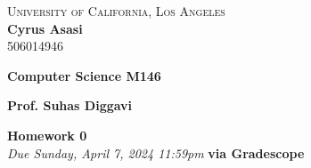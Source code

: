 \documentclass[letterpaper]{article}
\author{Hecate}
\date{\today}
\title{}
\theoremstyle{definition}
\begin{document}
\begin{center}
    \large\textsc{University of California, Los Angeles} \\
    \large\textbf{Cyrus Asasi} \\
    \large\textsc{506014946}
        
    \begin{minipage}[t]{0.5\textwidth}
        \raggedright
        \textbf{Computer Science M146}
    \end{minipage}%
    \begin{minipage}[t]{0.5\textwidth}
        \raggedleft
        \textbf{Prof. Suhas Diggavi}
    \end{minipage}
    \centering
    \large\textbf{Homework 0} \\
    \large\textit{Due Sunday, April 7, 2024 11:59pm} \textbf{via Gradescope}
\end{center}
\vspace{1cm}
\end{document}

